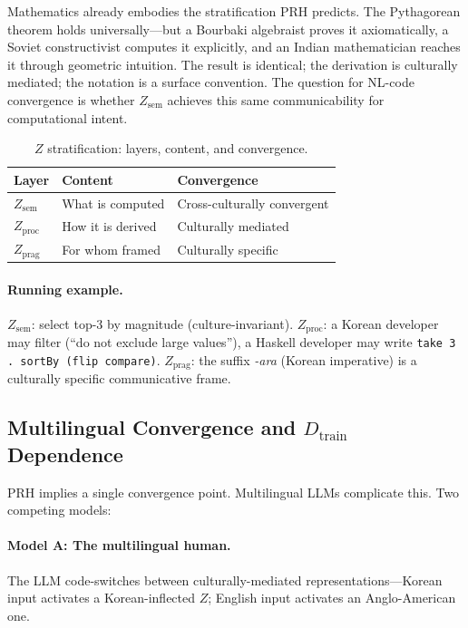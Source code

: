 \documentclass[11pt]{article}
\theoremstyle{definition}
\newcommand{\Zsem}{Z_{\text{sem}}}
\newcommand{\Zproc}{Z_{\text{proc}}}
\newcommand{\Zprag}{Z_{\text{prag}}}
\newcommand{\Dtrain}{D_{\text{train}}}
\begin{document}
Mathematics already embodies the stratification PRH predicts. The Pythagorean theorem holds universally---but a Bourbaki algebraist proves it axiomatically, a Soviet constructivist computes it explicitly, and an Indian mathematician reaches it through geometric intuition. The result is identical; the derivation is culturally mediated; the notation is a surface convention. The question for NL-code convergence is whether $\Zsem$ achieves this same communicability for computational intent.

\begin{table}[t]
\centering
\caption{$Z$ stratification: layers, content, and convergence.}
\label{tab:stratification}
\small
\begin{tabular}{lll}
\toprule
\textbf{Layer} & \textbf{Content} & \textbf{Convergence} \\
\midrule
$\Zsem$ & What is computed & Cross-culturally convergent \\
$\Zproc$ & How it is derived & Culturally mediated \\
$\Zprag$ & For whom framed & Culturally specific \\
\bottomrule
\end{tabular}
\end{table}

\paragraph{Running example.}
$\Zsem$: select top-3 by magnitude (culture-invariant). $\Zproc$: a Korean developer may filter (``do not exclude large values''), a Haskell developer may write \texttt{take 3 . sortBy (flip compare)}. $\Zprag$: the suffix \emph{-ara} (Korean imperative) is a culturally specific communicative frame.

\subsection{Multilingual Convergence and $\Dtrain$ Dependence}\label{sec:dtrain}

PRH implies a single convergence point. Multilingual LLMs complicate this. Two competing models:

\paragraph{Model A: The multilingual human.}
The LLM code-switches between culturally-mediated representations---Korean input activates a Korean-inflected $Z$; English input activates an Anglo-American one.
\end{document}
